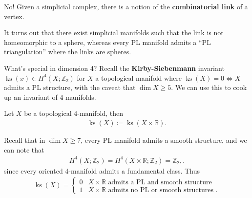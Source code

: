 \begin{answer}

No! Given a simplicial complex, there is a notion of the
\textbf{combinatorial link} of a vertex.

\begin{figure}
\centering
{}
\end{figure}

It turns out that there exist simplicial manifolds such that the link is
not homeomorphic to a sphere, whereas every PL manifold admits a ``PL
triangulation'' where the links are spheres.

\end{answer}

\begin{remark}

What's special in dimension 4? Recall the \textbf{Kirby-Siebenmann}
invariant \(\operatorname{ks}(x) \in H^4(X; {\mathbb{Z}}_2)\) for \(X\)
a topological manifold where \(\operatorname{ks}(X) = 0 \iff X\) admits
a PL structure, with the caveat that \(\dim X \geq 5\). We can use this
to cook up an invariant of 4-manifolds.

\end{remark}

\begin{definition}

Let \(X\) be a topological 4-manifold, then
\begin{align*}
\operatorname{ks}(X) \coloneqq\operatorname{ks}(X \times{\mathbb{R}})
.\end{align*}

\end{definition}

\begin{remark}

Recall that in \(\dim X\geq 7\), every PL manifold admits a smooth
structure, and we can note that
\begin{align*}
H^4(X; {\mathbb{Z}}_2) = H^4(X \times{\mathbb{R}}; {\mathbb{Z}}_2) = {\mathbb{Z}}_2,
.\end{align*}
since every oriented 4-manifold admits a fundamental class. Thus
\begin{align*}
\operatorname{ks}(X) = 
\begin{cases}
0 & X \times{\mathbb{R}}\text{ admits a PL and smooth structure} 
\\
1 & X \times{\mathbb{R}}\text{ admits no PL or smooth structures }.
\end{cases}
\end{align*}

\end{remark}

